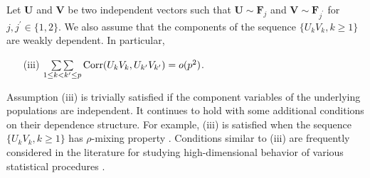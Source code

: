 \documentclass[twoside]{article}
\newcommand{\bF}{\mathbf{F}}
\newcommand{\bU}{\mathbf{U}}
\newcommand{\bV}{\mathbf{V}}
\newcommand{\0}{\mathbf{0}}
\newcommand{\1}{\mathbf{1}}
\numberwithin{equation}{section}
\begin{document}

Let $\bU$ and $\bV$ be two independent vectors such that $\bU\sim\bF_j$ and $\bV\sim\bF_{j^\prime}$ for $j,j^\prime\in\{1,2\}$. We also assume that the components of the sequence $\{U_kV_k,k\geq 1\}$ are weakly dependent. In particular,
\begin{enumerate}
\item[(iii)] $\mathop{\sum\sum}\limits_{1\leq k<k^\prime\leq p}{\rm Corr}(U_kV_k, U_{k^\prime}V_{k^\prime})=o(p^2)$.
\end{enumerate}

Assumption (iii) is trivially satisfied if the component variables of the underlying populations are independent. It continues to hold with some additional conditions on their dependence structure. For example, (iii) is satisfied when the sequence $\{U_kV_k,k\geq 1\}$ has $\rho$-mixing property \citep{bradley2005basic, HMN05}. Conditions similar to (iii) are frequently considered in the literature for studying high-dimensional behavior of various statistical procedures \citep{ASSYZM18}.
\end{document}
